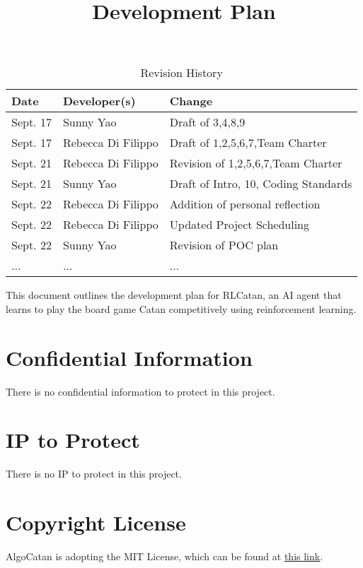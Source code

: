 \documentclass{article}
\title{Development Plan\\\progname}
\author{\authname}
\date{}
\begin{document}
\maketitle

\begin{table}[hp]
\caption{Revision History} \label{TblRevisionHistory}
\begin{tabularx}{\textwidth}{llX}
\toprule
\textbf{Date} & \textbf{Developer(s)} & \textbf{Change}\\
\midrule
Sept. 17 & Sunny Yao & Draft of 3,4,8,9\\
Sept. 17 & Rebecca Di Filippo & Draft of 1,2,5,6,7,Team Charter\\
Sept. 21 & Rebecca Di Filippo & Revision of 1,2,5,6,7,Team Charter\\
Sept. 21 & Sunny Yao & Draft of Intro, 10, Coding Standards\\
Sept. 22 & Rebecca Di Filippo & Addition of personal reflection\\
Sept. 22 & Rebecca Di Filippo & Updated Project Scheduling\\
Sept. 22 & Sunny Yao & Revision of POC plan\\
... & ... & ...\\
\bottomrule
\end{tabularx}
\end{table}

\newpage{}

\raggedright
This document outlines the development plan for RLCatan, an
AI agent that learns to play the board game Catan competitively 
using reinforcement learning. 

\section{Confidential Information}

\raggedright
There is no confidential information to protect in this project.

\section{IP to Protect}

\raggedright
There is no IP to protect in this project.

\section{Copyright License}

\raggedright{AlgoCatan is adopting the MIT License, which can be found at \href{https://github.com/SY3141/RLCatan/blob/main/LICENSE}{this link}.}
\end{document}
